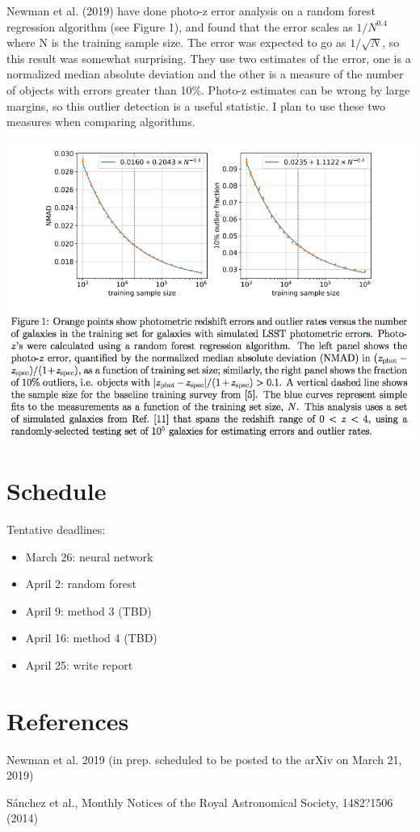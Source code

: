 \documentclass[13pt]{amsart}
\begin{document}
Newman et al. (2019) have done photo-z error analysis on a random forest regression algorithm (see Figure 1), and found that the error scales as $1/N^{0.4}$ where N is the training sample size. The error was expected to go as $1/\sqrt{N}$, so this result was somewhat surprising. They use two estimates of the error, one is a normalized median absolute deviation and the other is a measure of the number of objects with errors greater than 10\%. Photo-z estimates can be wrong by large margins, so this outlier detection is a useful statistic. I plan to use these two measures when comparing algorithms.

\includegraphics[width=\textwidth]{photozerrors.png}


\section{Schedule}

Tentative deadlines:

\begin{itemize}
\item March 26: neural network
\item April 2: random forest
\item April 9: method 3 (TBD)
\item April 16: method 4 (TBD)
\item April 25: write report
\end{itemize}




\section{References}
Newman et al. 2019 (in prep. scheduled to be posted to the arXiv on March 21, 2019)

S\'anchez et al., Monthly Notices of the Royal Astronomical Society, 1482?1506 (2014)
\end{document}
